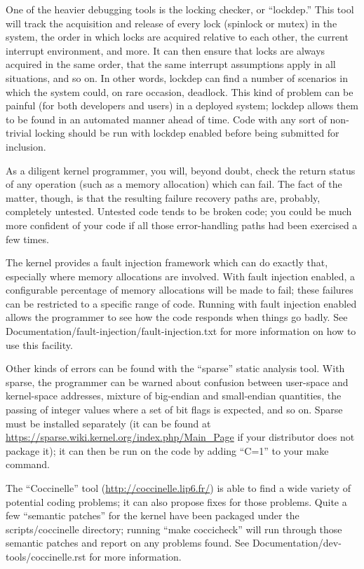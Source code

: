 \documentclass[a4paper,8pt,english]{sphinxmanual}
\begin{document}
One of the heavier debugging tools is the locking checker, or ``lockdep.''
This tool will track the acquisition and release of every lock (spinlock or
mutex) in the system, the order in which locks are acquired relative to
each other, the current interrupt environment, and more.  It can then
ensure that locks are always acquired in the same order, that the same
interrupt assumptions apply in all situations, and so on.  In other words,
lockdep can find a number of scenarios in which the system could, on rare
occasion, deadlock.  This kind of problem can be painful (for both
developers and users) in a deployed system; lockdep allows them to be found
in an automated manner ahead of time.  Code with any sort of non-trivial
locking should be run with lockdep enabled before being submitted for
inclusion.

As a diligent kernel programmer, you will, beyond doubt, check the return
status of any operation (such as a memory allocation) which can fail.  The
fact of the matter, though, is that the resulting failure recovery paths
are, probably, completely untested.  Untested code tends to be broken code;
you could be much more confident of your code if all those error-handling
paths had been exercised a few times.

The kernel provides a fault injection framework which can do exactly that,
especially where memory allocations are involved.  With fault injection
enabled, a configurable percentage of memory allocations will be made to
fail; these failures can be restricted to a specific range of code.
Running with fault injection enabled allows the programmer to see how the
code responds when things go badly.  See
Documentation/fault-injection/fault-injection.txt for more information on
how to use this facility.

Other kinds of errors can be found with the ``sparse'' static analysis tool.
With sparse, the programmer can be warned about confusion between
user-space and kernel-space addresses, mixture of big-endian and
small-endian quantities, the passing of integer values where a set of bit
flags is expected, and so on.  Sparse must be installed separately (it can
be found at \href{https://sparse.wiki.kernel.org/index.php/Main\_Page}{https://sparse.wiki.kernel.org/index.php/Main\_Page} if your
distributor does not package it); it can then be run on the code by adding
``C=1'' to your make command.

The ``Coccinelle'' tool (\href{http://coccinelle.lip6.fr/}{http://coccinelle.lip6.fr/}) is able to find a wide
variety of potential coding problems; it can also propose fixes for those
problems.  Quite a few ``semantic patches'' for the kernel have been packaged
under the scripts/coccinelle directory; running ``make coccicheck'' will run
through those semantic patches and report on any problems found.  See
Documentation/dev-tools/coccinelle.rst for more information.
\end{document}
